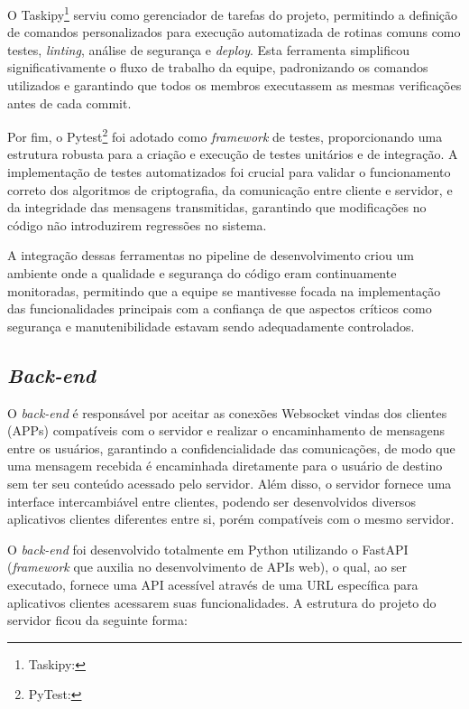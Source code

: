 O Taskipy\footnote{Taskipy: } serviu
como gerenciador de tarefas do projeto, permitindo a
definição de comandos personalizados para execução automatizada de
rotinas comuns como testes, \textit{linting}, análise de segurança e
\textit{deploy}.
Esta ferramenta simplificou significativamente o fluxo de trabalho da
equipe, padronizando os comandos utilizados e garantindo que todos os
membros executassem as mesmas verificações antes de cada commit.

Por fim, o Pytest\footnote{PyTest: }
foi adotado como \textit{framework} de testes,
proporcionando uma estrutura robusta para a criação e execução de
testes unitários e de integração. A implementação de testes
automatizados foi crucial para validar o funcionamento correto dos
algoritmos de criptografia, da comunicação entre cliente e servidor,
e da integridade das mensagens transmitidas, garantindo que
modificações no código não introduzirem regressões no sistema.

A integração dessas ferramentas no pipeline de desenvolvimento criou
um ambiente onde a qualidade e segurança do código eram continuamente
monitoradas, permitindo que a equipe se mantivesse focada na implementação das
funcionalidades principais com a confiança de que aspectos críticos
como segurança e manutenibilidade estavam sendo adequadamente controlados.

\subsection{\textit{Back-end}}

O \textit{back-end} é responsável por aceitar as conexões Websocket vindas dos
clientes (\acsp{APP}) compatíveis com o servidor e realizar o
encaminhamento de mensagens entre os usuários, garantindo a
confidencialidade das comunicações, de modo que uma mensagem recebida
é encaminhada diretamente para o usuário de destino sem ter seu
conteúdo acessado pelo servidor. Além disso, o servidor fornece uma
interface intercambiável entre clientes, podendo ser desenvolvidos
diversos aplicativos clientes diferentes entre si, porém compatíveis
com o mesmo servidor.

O \textit{back-end} foi desenvolvido totalmente em Python utilizando o FastAPI
(\textit{framework} que auxilia no desenvolvimento de \acsp{API} web), o
qual, ao ser executado, fornece uma \acs{API} acessível através de uma \acs{URL}
específica para aplicativos clientes acessarem suas funcionalidades.
A estrutura do projeto do servidor ficou da seguinte forma:

